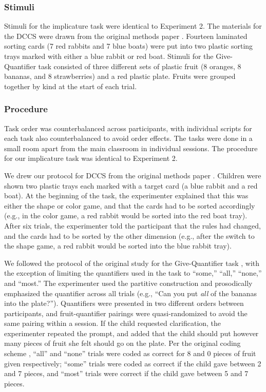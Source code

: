 \documentclass[man]{apa2}
\begin{document}
\subsubsection{Stimuli} Stimuli for the implicature task were identical to Experiment 2. The materials for the DCCS were drawn from the original methods paper \cite{zelazo2006}. Fourteen laminated sorting cards (7 red rabbits and 7 blue boats) were put into two plastic sorting trays marked with either a blue rabbit or red boat. Stimuli for the Give-Quantifier task \cite{barner2009} consisted of three different sets of plastic fruit (8 oranges, 8 bananas, and 8 strawberries) and a red plastic plate. Fruits were grouped together by kind at the start of each trial.

\subsubsection{Procedure}
Task order was counterbalanced across participants, with individual scripts for each task also counterbalanced to avoid order effects. The tasks were done in a small room apart from the main classroom in individual sessions. The procedure for our implicature task was identical to Experiment 2. 

We drew our protocol for DCCS from the original methods paper \cite{zelazo2006}. Children were shown two plastic trays each marked with a target card (a blue rabbit and a red boat). At the beginning of the task, the experimenter explained that this was either the shape or color game, and that the cards had to be sorted accordingly (e.g., in the color game, a red rabbit would be sorted into the red boat tray). After six trials, the experimenter told the participant that the rules had changed, and the cards had to be sorted by the other dimension (e.g., after the switch to the shape game, a red rabbit would be sorted into the blue rabbit tray).

We followed the protocol of the original study for the Give-Quantifier task \cite{barner2009}, with the exception of limiting the quantifiers used in the task to ``some,'' ``all,'' ``none,'' and ``most.'' The experimenter used the partitive construction and prosodically emphasized the quantifier across all trials (e.g., ``Can you put \textit{all} of the bananas into the plate?''). Quantifiers were presented in two different orders between participants, and fruit-quantifier pairings were quasi-randomized to avoid the same pairing within a session. If the child requested clarification, the experimenter repeated the prompt, and added that the child should put however many pieces of fruit she felt should go on the plate. Per the original coding scheme \cite{barner2009}, ``all'' and ``none'' trials were coded as correct for 8 and 0 pieces of fruit given respectively; ``some'' trials were coded as correct if the child gave between 2 and 7 pieces, and ``most'' trials were correct if the child gave between 5 and 7 pieces.
\end{document}
